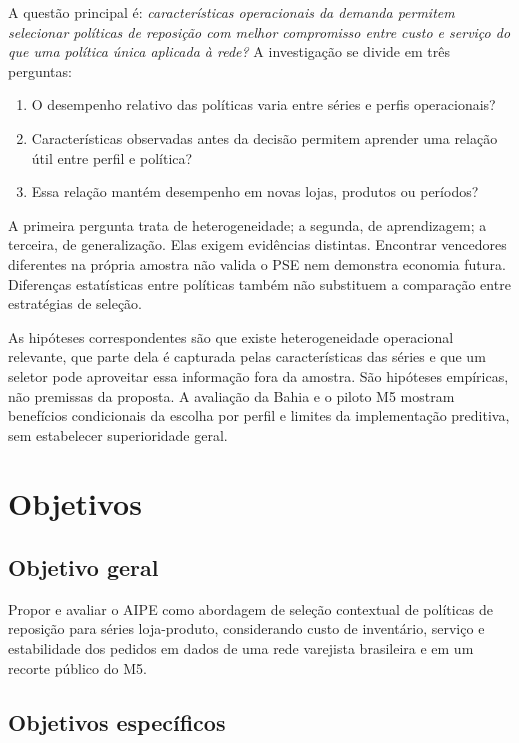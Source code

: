 A questão principal é: \emph{características operacionais da demanda permitem selecionar políticas de reposição com melhor compromisso entre custo e serviço do que uma política única aplicada à rede?} A investigação se divide em três perguntas:

\begin{enumerate}
  \item O desempenho relativo das políticas varia entre séries e perfis operacionais?
  \item Características observadas antes da decisão permitem aprender uma relação útil entre perfil e política?
  \item Essa relação mantém desempenho em novas lojas, produtos ou períodos?
\end{enumerate}

A primeira pergunta trata de heterogeneidade; a segunda, de aprendizagem; a terceira, de generalização. Elas exigem evidências distintas. Encontrar vencedores diferentes na própria amostra não valida o PSE nem demonstra economia futura. Diferenças estatísticas entre políticas também não substituem a comparação entre estratégias de seleção.

As hipóteses correspondentes são que existe heterogeneidade operacional relevante, que parte dela é capturada pelas características das séries e que um seletor pode aproveitar essa informação fora da amostra. São hipóteses empíricas, não premissas da proposta. A avaliação da Bahia e o piloto M5 mostram benefícios condicionais da escolha por perfil e limites da implementação preditiva, sem estabelecer superioridade geral.

\section{Objetivos}

\subsection*{Objetivo geral}

Propor e avaliar o AIPE como abordagem de seleção contextual de políticas de reposição para séries loja-produto, considerando custo de inventário, serviço e estabilidade dos pedidos em dados de uma rede varejista brasileira e em um recorte público do M5.

\subsection*{Objetivos específicos}

